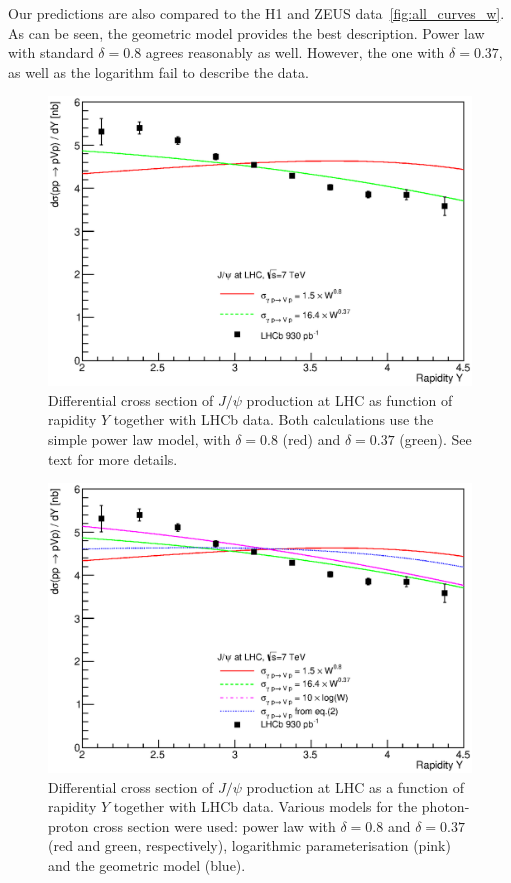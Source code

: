 \documentclass[12pt]{article}
\begin{document}
Our predictions are also compared to the H1 and ZEUS data~\ref{fig:all_curves_w}.
As can be seen, the geometric model provides the best description.
Power law with standard $\delta=0.8$ agrees reasonably as well.
However, the one with $\delta=0.37$, as well as the logarithm fail to describe the data.

\begin{figure}[!h]
\centering
 \includegraphics[width=.8\textwidth]{figures/dSigma_dy_comparison2.eps}
 \caption{Differential cross section of $J/\psi$ production at LHC as function of rapidity $Y$ together with LHCb data.
          Both calculations use the simple power law model, with $\delta=0.8$ (red) and $\delta=0.37$ (green).
          See text for more details.}
 \label{fig:delta_fit}
\end{figure}

\begin{figure}[p]
\centering
 \includegraphics[width=.8\textwidth]{figures/dSigma_dy_comparison3.eps}
 \caption{Differential cross section of $J/\psi$ production at LHC as a function of rapidity $Y$ together with LHCb data.
          Various models for the photon-proton cross section were used: power law with $\delta=0.8$ and $\delta=0.37$ (red and green, respectively),
          logarithmic parameterisation (pink) and the geometric model (blue).
          }
  \label{fig:all_curves}
\end{figure}
\end{document}
